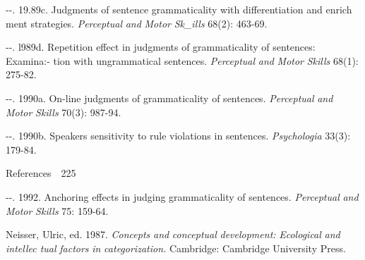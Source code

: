 \begin{listWWNumivleveli}
\item 
\begin{styleStandard}
{}-{}-. 19.89c. Judgments of sentence grammaticality with differentiation and enrich\- ment strategies. \textit{Perceptual}\textit{ }\textit{and}\textit{ }\textit{Motor}\textit{ }\textit{Sk\_ills }68(2): 463-69.
\end{styleStandard}


\item 
\begin{styleStandard}
{}-{}-. l989d. Repetition effect in judgments of grammaticality of sentences: Examina:-{\textquotesingle} tion with ungrammatical sentences. \textit{Perceptual}\textit{ }\textit{and}\textit{ }\textit{Motor}\textit{ }\textit{Skills}\textit{ }68(1): 275-82.
\end{styleStandard}


\item 
\begin{styleStandard}
{}-{}-. 1990a. On-line judgments of grammaticality of sentences. \textit{Perceptual}\textit{ }\textit{and}\textit{ }\textit{Motor}\textit{ }\textit{Skills}\textit{ }70(3): 987-94.
\end{styleStandard}


\item 
\begin{styleStandard}
{}-{}-. 1990b. Speaker{\textquotesingle}s sensitivity to rule violations in sentences. \textit{Psychologia}\textit{ }33(3): 179-84.
\end{styleStandard}


\end{listWWNumivleveli}
\clearpage\setcounter{page}{1}\begin{styleStandard}
References\ \ 225
\end{styleStandard}


\begin{listWWNumivleveli}
\item 
\begin{styleStandard}
{}-{}-. 1992. Anchoring effects in judging grammaticality of sentences. \textit{Perceptual}\textit{ }\textit{and}\textit{ }\textit{Motor}\textit{ }\textit{Skills }75: 159-64.
\end{styleStandard}


\end{listWWNumivleveli}
\begin{styleStandard}
Neisser, Ulric, ed. 1987. \textit{Concepts}\textit{ }\textit{and}\textit{ }\textit{conceptual}\textit{ }\textit{development:}\textit{ }\textit{Ecological}\textit{ }\textit{and}\textit{ }\textit{intellec\- tual}\textit{ }\textit{factors}\textit{ }\textit{in}\textit{ }\textit{categorization.}\textit{ }Cambridge: Cambridge University Press.
\end{styleStandard}


